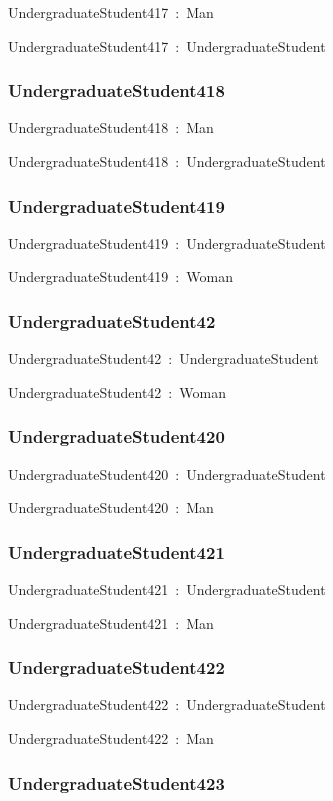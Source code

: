 \documentclass{article}
\begin{document}
UndergraduateStudent417~:~Man

UndergraduateStudent417~:~UndergraduateStudent

\subsubsection*{UndergraduateStudent418}

UndergraduateStudent418~:~Man

UndergraduateStudent418~:~UndergraduateStudent

\subsubsection*{UndergraduateStudent419}

UndergraduateStudent419~:~UndergraduateStudent

UndergraduateStudent419~:~Woman

\subsubsection*{UndergraduateStudent42}

UndergraduateStudent42~:~UndergraduateStudent

UndergraduateStudent42~:~Woman

\subsubsection*{UndergraduateStudent420}

UndergraduateStudent420~:~UndergraduateStudent

UndergraduateStudent420~:~Man

\subsubsection*{UndergraduateStudent421}

UndergraduateStudent421~:~UndergraduateStudent

UndergraduateStudent421~:~Man

\subsubsection*{UndergraduateStudent422}

UndergraduateStudent422~:~UndergraduateStudent

UndergraduateStudent422~:~Man

\subsubsection*{UndergraduateStudent423}
\end{document}
